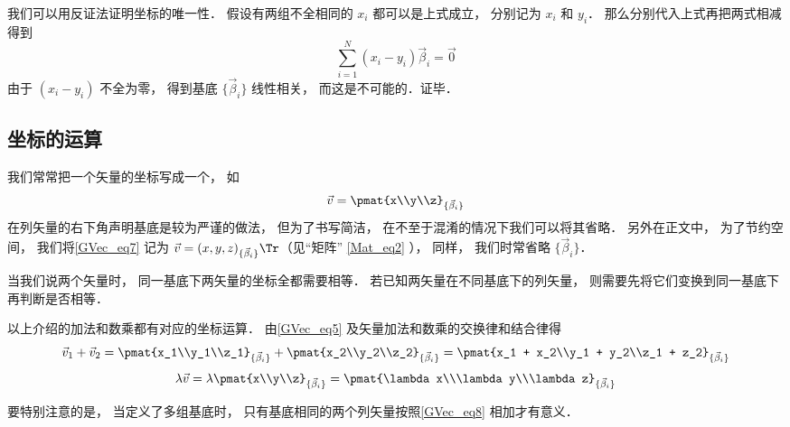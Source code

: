 我们可以用反证法证明坐标的唯一性． 假设有两组不全相同的 $x_i$ 都可以是上式成立， 分别记为 $x_i$ 和 $y_i$． 那么分别代入上式再把两式相减得到
\begin{equation}
\sum_{i=1}^N (x_i-y_i) \vec \beta_i = \vec 0
\end{equation}
由于 $(x_i-y_i)$ 不全为零， 得到基底 $\{\vec \beta_i\}$ 线性相关， 而这是不可能的．证毕．

\subsection{坐标的运算}
我们常常把一个矢量的坐标写成一个， 如
\begin{equation}\label{GVec_eq7}
\vec v = \pmat{x\\y\\z}_{\{\vec\beta_i\}}
\end{equation}
在列矢量的右下角声明基底是较为严谨的做法， 但为了书写简洁， 在不至于混淆的情况下我们可以将其省略． 另外在正文中， 为了节约空间， 我们将\autoref{GVec_eq7} 记为 $\vec v = (x, y, z)_{\{\vec\beta_i\}}\Tr$（见“矩阵” \autoref{Mat_eq2} ）， 同样， 我们时常省略 $\{\vec\beta_i\}$．

当我们说两个矢量时， 同一基底下两矢量的坐标全都需要相等． 若已知两矢量在不同基底下的列矢量， 则需要先将它们变换到同一基底下再判断是否相等．

以上介绍的加法和数乘都有对应的坐标运算． 由\autoref{GVec_eq5} 及矢量加法和数乘的交换律和结合律得
\begin{equation}\label{GVec_eq8}
\vec v_1 + \vec v_2 = \pmat{x_1\\y_1\\z_1}_{\{\vec\beta_i\}} + \pmat{x_2\\y_2\\z_2}_{\{\vec\beta_i\}} = \pmat{x_1 + x_2\\y_1 + y_2\\z_1 + z_2}_{\{\vec\beta_i\}}
\end{equation}
\begin{equation}\label{GVec_eq9}
\lambda \vec v = \lambda\pmat{x\\y\\z}_{\{\vec\beta_i\}} = \pmat{\lambda x\\\lambda y\\\lambda z}_{\{\vec\beta_i\}}
\end{equation}

要特别注意的是， 当定义了多组基底时， 只有基底相同的两个列矢量按照\autoref{GVec_eq8} 相加才有意义．





